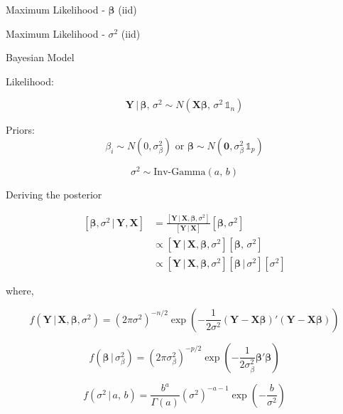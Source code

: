 \documentclass[11pt,ignorenonframetext,]{beamer}
\begin{document}
\begin{frame}{Maximum Likelihood - \(\symbf{\beta}\) (iid)}
\protect\hypertarget{maximum-likelihood---symbfbeta-iid}{}

\end{frame}

\begin{frame}{Maximum Likelihood - \(\sigma^2\) (iid)}
\protect\hypertarget{maximum-likelihood---sigma2-iid}{}

\end{frame}

\begin{frame}[t]{Bayesian Model}
\protect\hypertarget{bayesian-model}{}

Likelihood:

\[
\symbf{Y} \,|\, \symbf{\beta}, \, \sigma^2 \sim N(\symbf{X}\symbf{\beta},\, \sigma^2 \, {\mathbb{1}_n})
\]

\pause

Priors: \[
\beta_i \sim N(0, \sigma^2_\beta)
\text{  or  } 
\symbf{\beta} \sim N(\symbf{0}, \sigma^2_\beta \, {\mathbb{1}_p})
\]

\[
\sigma^2 \sim \text{Inv-Gamma}(a,\,b)
\]

\end{frame}

\begin{frame}[t]{Deriving the posterior}
\protect\hypertarget{deriving-the-posterior}{}

\footnotesize

\[ 
\begin{aligned}
\left[ \symbf{\beta}, \sigma^2 \,|\, \symbf{Y}, \symbf{X} \right] 
  &= \frac{[\symbf{Y} \,|\, \symbf{X}, \symbf{\beta}, \sigma^2]}{[\symbf{Y} \,|\, \symbf{X}]} [\symbf{\beta}, \sigma^2] \\
  &\propto [\symbf{Y} \,|\, \symbf{X}, \symbf{\beta}, \sigma^2] [\symbf{\beta},\,\sigma^2] \\
  &\propto [\symbf{Y} \,|\, \symbf{X}, \symbf{\beta}, \sigma^2] [\symbf{\beta}\,|\,\sigma^2] [\sigma^2]
\end{aligned}
\]

\pause

where,

\[ 
f(\symbf{Y} \,|\, \symbf{X}, \symbf{\beta}, \sigma^2) = 
\left(2\pi \sigma^2\right)^{-n/2} \exp\left( -\frac{1}{2\sigma^2} (\symbf{Y}-\symbf{X}\symbf{\beta})'(\symbf{Y}-\symbf{X}\symbf{\beta}) \right) 
\]

\pause

\[ 
f(\symbf{\beta}\,|\, \sigma^2_\beta) = (2\pi \sigma^2_\beta)^{-p/2} \exp\left( -\frac{1}{2\sigma^2_\beta} \symbf{\beta}'\symbf{\beta} \right) 
\]

\pause

\[
f(\sigma^2 \,|\, a,\, b) = \frac{b^a}{\Gamma(a)} (\sigma^2)^{-a-1} \exp\left( -\frac{b}{\sigma^2} \right) 
\]

\end{frame}
\end{document}
